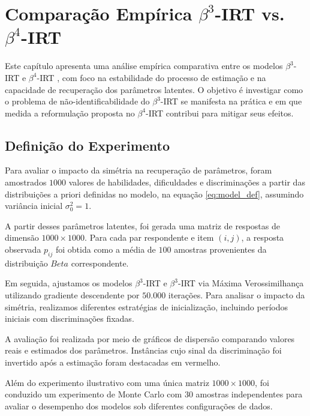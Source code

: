 \chapter{Comparação Empírica $\beta^{3}$-\gls{IRT} vs. $\beta^4$-\gls{IRT}}
\label{ap:beta3beta4}

Este capítulo apresenta uma análise empírica comparativa entre os modelos $\beta^{3}$-\gls{IRT} e $\beta^{4}$-\gls{IRT} , com foco na estabilidade do processo de estimação e na capacidade de recuperação dos parâmetros latentes. O objetivo é investigar como o problema de não-identificabilidade do $\beta^{3}$-\gls{IRT} se manifesta na prática e em que medida a reformulação proposta no $\beta^{4}$-\gls{IRT}  contribui para mitigar seus efeitos.

\section{Definição do Experimento}

Para avaliar o impacto da simétria  na recuperação de parâmetros, foram amostrados $1000$ valores de habilidades, dificuldades e discriminações a partir das distribuições a priori definidas no modelo, na equação \ref{eq:model_def}, assumindo variância inicial $\sigma_{0}^2 = 1$.

A partir desses parâmetros latentes, foi gerada uma matriz de respostas de dimensão $1000 \times 1000$. Para cada par respondente e item $(i, j)$, a resposta observada $p_{ij}$ foi obtida como a média de $100$ amostras provenientes da distribuição $Beta$ correspondente.

Em seguida, ajustamos os modelos $\beta^3$-\gls{IRT} e $\beta^3$-\gls{IRT} via Máxima Verossimilhança utilizando gradiente descendente por $50.000$ iterações. Para analisar o impacto da simétria, realizamos diferentes estratégias de inicialização, incluindo períodos iniciais com discriminações fixadas.

A avaliação foi realizada por meio de gráficos de dispersão comparando valores reais e estimados dos parâmetros. Instâncias cujo sinal da discriminação foi invertido após a estimação foram destacadas em vermelho.

Além do experimento ilustrativo com uma única matriz 
$1000\times1000$, foi conduzido um experimento de Monte Carlo com $30$ amostras independentes para avaliar o desempenho dos modelos sob diferentes configurações de dados.


